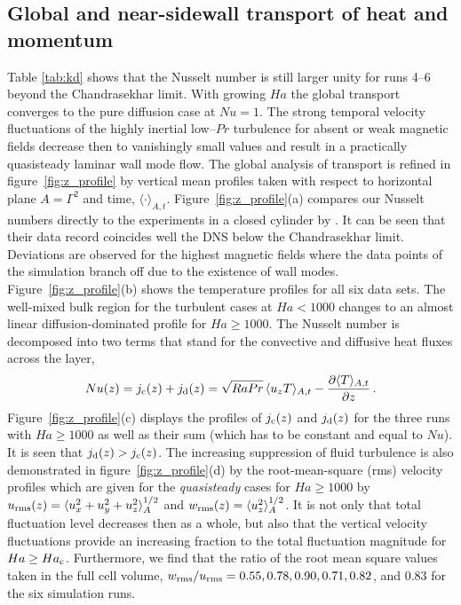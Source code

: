 \documentclass{jfm}
\begin{document}
\subsection{Global and near-sidewall transport of heat and momentum}   
Table \ref{tab:kd} shows that the Nusselt number is still larger unity for runs 4--6 beyond the Chandrasekhar limit.
With growing $Ha$ the global transport converges to the pure diffusion case at  $Nu=1$. The strong temporal velocity fluctuations of the 
highly inertial low--$Pr$ turbulence for absent or weak magnetic fields decrease then to vanishingly small values and result in a practically 
quasisteady laminar wall mode flow. The global analysis of transport is refined in figure~\ref{fig:z_profile} by vertical mean profiles 
taken with respect to horizontal plane $A=\Gamma^2$ and time, $\langle\cdot\rangle_{A,t}$. Figure~\ref{fig:z_profile}(a) compares our 
Nusselt numbers directly to the experiments in a closed cylinder by \cite{Cioni2000}. It can be seen that their data record coincides well 
the DNS below the Chandrasekhar limit. Deviations are observed for the highest magnetic fields where the data points of the 
simulation branch off due to the existence of wall modes. Figure~\ref{fig:z_profile}(b) shows the temperature profiles for all six data sets. 
The well-mixed bulk region for the turbulent cases at $Ha < 1000$ changes to an almost linear diffusion-dominated profile for $Ha\ge 1000$. 
The Nusselt number is decomposed into two terms that stand for the convective and diffusive heat fluxes across the layer,
\begin{equation}
Nu(z)=j_{\rm c}(z)+j_{\rm d}(z)=\sqrt{Ra Pr}\, \langle u_z T\rangle_{A,t}-\frac{\partial \langle T\rangle_{A,t}}{\partial z}\,.
\label{Nusselt}
\end{equation}
Figure~\ref{fig:z_profile}(c) displays the profiles of $j_{\rm c}(z)$ and $j_{\rm d}(z)$ for the three runs with $Ha\ge 1000$ as well as their sum 
(which has to be constant and equal to $Nu$). It is seen that $j_{\rm d}(z) >j_{\rm c}(z)$. The increasing suppression of fluid turbulence is also 
demonstrated in figure~\ref{fig:z_profile}(d) by the root-mean-square (rms) velocity profiles which are given for the {\em quasisteady} cases 
for $Ha\ge 1000$ by $u_{\rm rms}(z)=\langle u_x^2+u_y^2+u_z^2\rangle_{A}^{1/2}$ and $w_{\rm rms}(z) =\langle u_z^2\rangle_{A}^{1/2}$. 
It is not only that total fluctuation level decreases then as a whole, but also that the vertical velocity fluctuations provide an increasing fraction 
to the total fluctuation magnitude for $Ha\ge Ha_{\rm c}$. Furthermore, we find that the ratio of the root mean square values taken in the full 
cell volume, $w_{\rm rms}/u_{\rm rms}= 0.55, 0.78, 0.90, 0.71, 0.82$, and 0.83 for the six simulation runs. 
\end{document}
